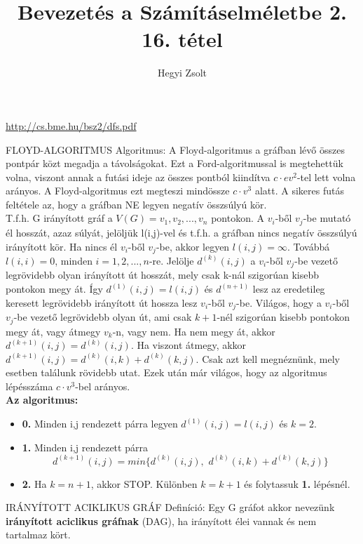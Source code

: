 \documentclass[]{article}
\title{Bevezetés a Számításelméletbe 2.\\{\large 16. tétel}}
\author{Hegyi Zsolt}
\begin{document}
\maketitle
\url{http://cs.bme.hu/bsz2/dfs.pdf}
\begin{framed}
FLOYD-ALGORITMUS Algoritmus: A Floyd-algoritmus a gráfban lévő összes pontpár közt megadja a távolságokat. Ezt a Ford-algoritmussal is megtehettük volna, viszont annak a futási ideje az összes pontból kiindítva $c\cdot ev^2$-tel lett volna arányos. A Floyd-algoritmus ezt megteszi mindössze $c\cdot v^3$ alatt. A sikeres futás feltétele az, hogy a gráfban NE legyen negatív összsúlyú kör.\\
T.f.h. G irányított gráf a $V(G) = {v_1, v_2,..., v_n}$ pontokon. A $v_i$-ből $v_j$-be mutató él hosszát, azaz súlyát, jelöljük l(i,j)-vel és t.f.h. a gráfban nincs negatív összsúlyú irányított kör. Ha nincs él $v_i$-ből $v_j$-be, akkor legyen $l(i,j) = \infty$. Továbbá $l(i,i) = 0$, minden $i = 1, 2,..., n$-re. Jelölje $d^{(k)}(i,j)$ a $v_i$-ből $v_j$-be vezető legrövidebb olyan irányított út hosszát, mely csak k-nál szigorúan kisebb pontokon megy át. Így $d^{(1)}(i,j) = l(i,j)$ és $d^{(n+1)}$ lesz az eredetileg keresett legrövidebb irányított út hossza lesz $v_i$-ből $v_j$-be. Világos, hogy a $v_i$-ből $v_j$-be vezető legrövidebb olyan út, ami csak $k + 1$-nél szigorúan kisebb pontokon megy át, vagy átmegy $v_k$-n, vagy nem. Ha nem megy át, akkor $d^{(k+1)}(i,j) = d^{(k)}(i,j)$. Ha viszont átmegy, akkor $d^{(k+1)}(i,j) = d^{(k)}(i,k) + d^{(k)}(k,j)$. Csak azt kell megnéznünk, mely esetben találunk rövidebb utat. Ezek után már világos, hogy az algoritmus lépésszáma $c\cdot v^3$-bel arányos.
\\
\textbf{Az algoritmus:}
\begin{itemize}
\item{\textbf{0.}} Minden i,j rendezett párra legyen $d^{(1)}(i,j) = l(i,j)$ és $k=2$.
\item{\textbf{1.}} Minden i,j rendezett párra
$$d^{(k+1)}(i,j) = min\{d^{(k)}(i,j),\,\, d^{(k)}(i,k) + d^{(k)}(k,j)\}$$
\item{\textbf{2.}} Ha $k = n + 1$, akkor STOP. Különben $k = k + 1$ és folytassuk \textbf{1.} lépésnél.
\end{itemize}
\end{framed}
\begin{shaded}
IRÁNYÍTOTT ACIKLIKUS GRÁF Definíció: Egy G gráfot akkor nevezünk \textbf{irányított aciclikus gráfnak} (DAG), ha irányított élei vannak és nem tartalmaz kört.
\end{shaded}
\end{document}
